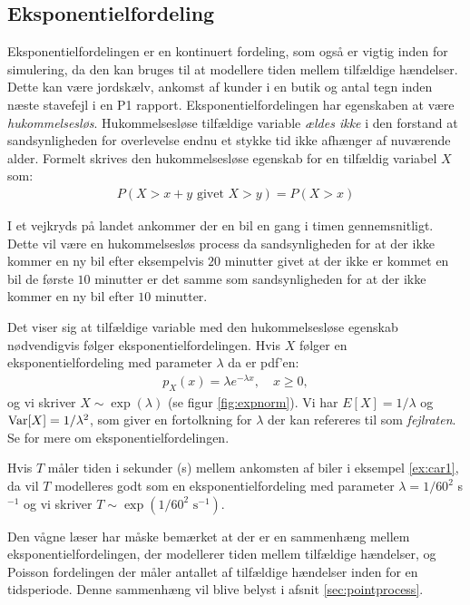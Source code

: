 \subsection{Eksponentielfordeling}
Eksponentielfordelingen er en kontinuert fordeling, som også er vigtig inden for simulering, da den kan bruges til at modellere tiden mellem tilfældige hændelser. Dette kan være jordskælv, ankomst af kunder i en butik og antal tegn inden næste stavefejl i en P1 rapport. Eksponentielfordelingen har egenskaben at være \emph{hukommelsesløs}. Hukommelsesløse tilfældige variable \emph{ældes ikke} i den forstand at sandsynligheden for overlevelse endnu et stykke tid ikke afhænger af nuværende alder. Formelt skrives den hukommelsesløse egenskab for en tilfældig variabel $X$ som: 
\begin{align*}
P(X > x + y \text{ givet } X > y) = P(X > x)
\end{align*}
\begin{example} \label{ex:car1}
I et vejkryds på landet ankommer der en bil en gang i timen gennemsnitligt. Dette vil være en hukommelsesløs process da sandsynligheden for at der ikke kommer en ny bil efter eksempelvis $20$ minutter givet at der ikke er kommet en bil de første $10$ minutter er det samme som sandsynligheden for at der ikke kommer en ny bil efter $10$ minutter. 
\end{example}
Det viser sig at tilfældige variable med den hukommelsesløse egenskab nødvendigvis følger eksponentielfordelingen. Hvis $X$ følger en eksponentielfordeling med parameter $\lambda$ da er pdf'en:
\begin{align*}
p_X(x) = \lambda e^{-\lambda x}, \quad x \geq 0,
\end{align*}
og vi skriver $X \sim \exp(\lambda)$ (se figur \ref{fig:expnorm}). Vi har $E[X] = 1/\lambda$ og $\operatorname{Var}[X] = 1/\lambda^2$, som giver en fortolkning for $\lambda$ der kan refereres til som \emph{fejlraten}. Se \cite[123-127]{olofsson2012} for mere om eksponentielfordelingen. 
\begin{example} \label{ex:car2}
Hvis $T$ måler tiden i sekunder (s) mellem ankomsten af biler i eksempel \ref{ex:car1}, da vil $T$ modelleres godt som en eksponentielfordeling med parameter $\lambda = 1/60^2$ s$^{-1}$ og vi skriver $T \sim \exp(1/60^{2} \text{ s}^{-1})$. 
\end{example}
Den vågne læser har måske bemærket at der er en sammenhæng mellem eksponentielfordelingen, der modellerer tiden mellem tilfældige hændelser, og Poisson fordelingen der måler antallet af tilfældige hændelser inden for en tidsperiode. Denne sammenhæng vil blive belyst i afsnit \ref{sec:pointprocess}. 
